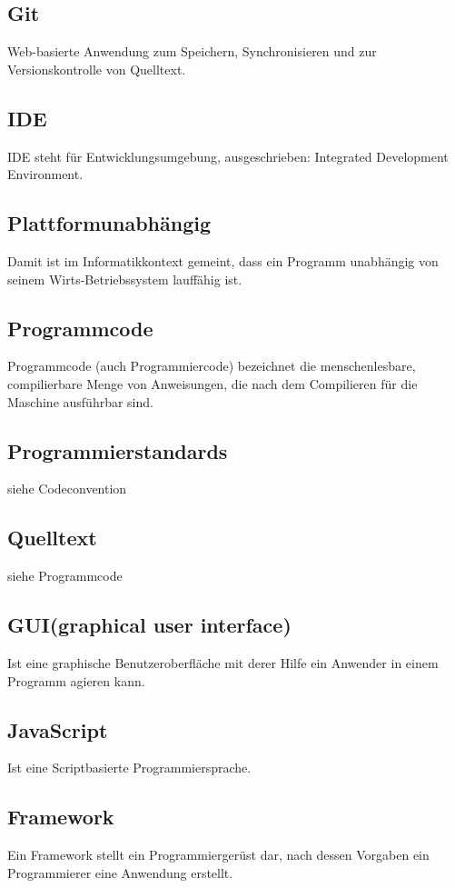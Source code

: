 \documentclass[11pt,a4paper]{article}
\begin{document}
\subsection{Git}
Web-basierte Anwendung zum Speichern, Synchronisieren und zur Versionskontrolle von Quelltext.

\subsection{IDE} 
IDE steht für Entwicklungsumgebung, ausgeschrieben: Integrated Development Environment.

\subsection{Plattformunabhängig} Damit ist im Informatikkontext gemeint, dass ein Programm unabhängig von seinem Wirts-Betriebssystem lauffähig ist.

\subsection{Programmcode} Programmcode (auch Programmiercode) bezeichnet die menschenlesbare, compilierbare Menge von Anweisungen, die nach dem Compilieren für die Maschine ausführbar sind.

\subsection{Programmierstandards}
siehe Codeconvention

\subsection{Quelltext}
siehe Programmcode

\subsection{GUI(graphical user interface)} Ist eine graphische Benutzeroberfläche mit derer Hilfe ein Anwender in einem Programm agieren kann.

\subsection{JavaScript} Ist eine Scriptbasierte Programmiersprache.

\subsection{Framework}
Ein Framework stellt ein Programmiergerüst dar, nach dessen Vorgaben ein Programmierer eine Anwendung erstellt.
\end{document}
